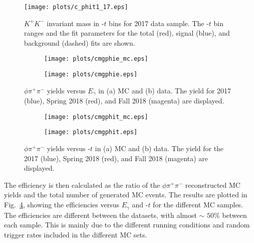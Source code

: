 \begin{figure}[H]
    \centering
    \texttt{[image: plots/c\_phit1\_17.eps]}
    \caption{\label{fig.xsec_ul.phi2pi.6}$K^{+}K^{-}$ invariant mass in -$t$ bins for 2017 data sample. The -$t$ bin ranges and the fit parameters for the total (red), signal (blue), and background (dashed) fits are shown.}
\end{figure}

\begin{figure}[H]
    \centering
    \begin{subfigure}[b]{0.5\textwidth}
        \texttt{[image: plots/cmgphie\_mc.eps]}
        \caption{}
        \label{fig.xsec_ul.phi2pi.7.a}
    \end{subfigure}\hfill
    \begin{subfigure}[b]{0.5\textwidth}
        \texttt{[image: plots/cmgphie.eps]}
        \caption{}
        \label{fig.xsec_ul.phi2pi.7.b}
    \end{subfigure}
    \caption{\label{fig.xsec_ul.phi2pi.7}$\phi \pi^+ \pi^-$ yields versus $E_{\gamma}$ in (a) MC and (b) data. The yield for 2017 (blue), Spring 2018 (red), and Fall 2018 (magenta) are displayed.}
\end{figure}

\begin{figure}[H]
    \centering
    \begin{subfigure}[b]{0.5\textwidth}
        \texttt{[image: plots/cmgphit\_mc.eps]}
        \caption{}
        \label{fig.xsec_ul.phi2pi.8.a}
    \end{subfigure}\hfill
    \begin{subfigure}[b]{0.5\textwidth}
        \texttt{[image: plots/cmgphit.eps]}
        \caption{}
        \label{fig.xsec_ul.phi2pi.8.b}
    \end{subfigure}
    \caption{\label{fig.xsec_ul.phi2pi.8}$\phi \pi^+ \pi^-$ yields versus -$t$ in (a) MC and (b) data. The yield for the 2017 (blue), Spring 2018 (red), and Fall 2018 (magenta) are displayed.}
\end{figure}

The efficiency is then calculated as the ratio of the $\phi \pi^+ \pi^-$ reconstructed MC yields and the total number of generated MC events. The results are plotted in Fig.~\ref{fig.xsec_ul.phi2pi.7}, showing the efficiencies versus $E_{\gamma}$ and -$t$ for the different MC samples. The efficiencies are different between the datasets, with almost $\sim$ $50\%$ between each sample. This is mainly due to the different running conditions and random trigger rates included in the different MC sets.

